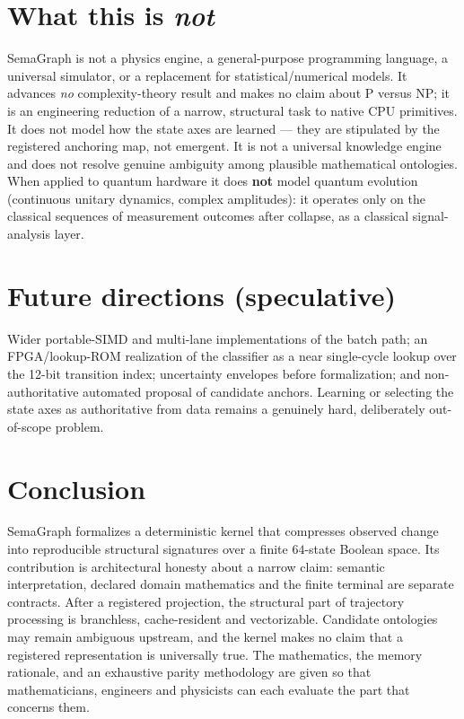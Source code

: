 \documentclass[11pt,a4paper]{article}
\begin{document}
\section{What this is \emph{not}}\label{sec:not}
SemaGraph is not a physics engine, a general-purpose programming language, a
universal simulator, or a replacement for statistical/numerical models. It advances
\emph{no} complexity-theory result and makes no claim about P versus NP; it is an
engineering reduction of a narrow, structural task to native CPU primitives. It
does not model how the state axes are learned --- they are stipulated by the
registered anchoring map, not emergent. It is not a universal knowledge engine and
does not resolve genuine ambiguity among plausible mathematical ontologies. When
applied to quantum hardware it does \textbf{not}
model quantum evolution (continuous unitary dynamics, complex amplitudes): it
operates only on the classical sequences of measurement outcomes after collapse,
as a classical signal-analysis layer.

\section{Future directions (speculative)}
Wider portable-SIMD and multi-lane implementations of the batch path; an
FPGA/lookup-ROM realization of the classifier as a near single-cycle lookup over the
12-bit transition index; uncertainty envelopes before formalization; and
non-authoritative automated proposal of candidate anchors. Learning or selecting
the state axes as authoritative from data remains a genuinely hard, deliberately
out-of-scope problem.

\section{Conclusion}
SemaGraph formalizes a deterministic kernel that compresses observed change into
reproducible structural signatures over a finite $64$-state Boolean space. Its
contribution is architectural honesty about a narrow claim: semantic interpretation,
declared domain mathematics and the finite terminal are separate contracts. After
a registered projection, the structural part of trajectory processing is
branchless, cache-resident and vectorizable. Candidate ontologies may remain
ambiguous upstream, and the kernel makes no claim that a registered representation
is universally true. The mathematics, the memory rationale, and an exhaustive parity methodology are given so that
mathematicians, engineers and physicists can each evaluate the part that concerns
them.
\end{document}
